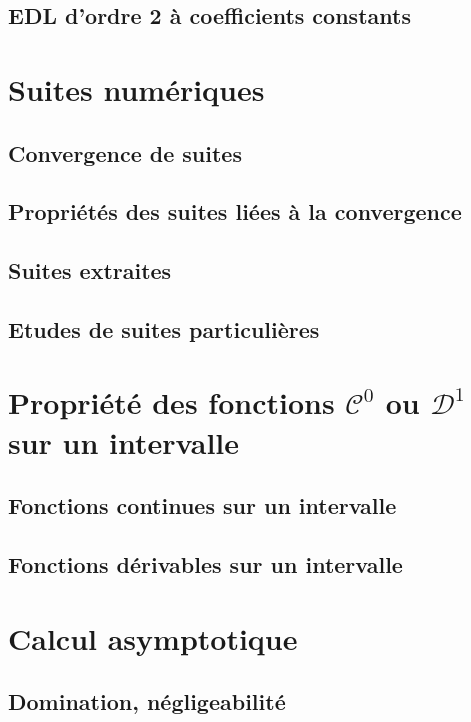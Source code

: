 \documentclass[11pt,twoside,a4paper]{article}
\begin{document}
\subsection{EDL d'ordre 2 à coefficients constants}

\newpage
\section{Suites numériques}

\subsection{Convergence de suites}

\subsection{Propriétés des suites liées à la convergence}

\subsection{Suites extraites}

\subsection{Etudes de suites particulières}

\newpage
\section{Propriété des fonctions $\mathcal{C}^0$ ou $\mathcal{D}^1$ sur un intervalle}

\subsection{Fonctions continues sur un intervalle}

\subsection{Fonctions dérivables sur un intervalle}

\newpage
\section{Calcul asymptotique }

\subsection{Domination, négligeabilité}
\end{document}
